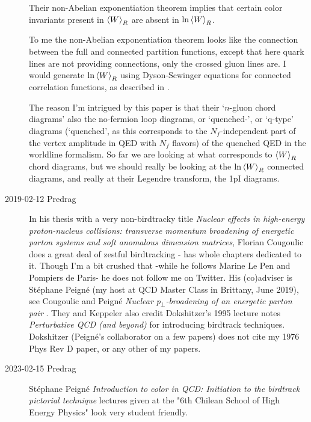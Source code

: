 \begin{description}
Their non-Abelian exponentiation theorem implies that certain color
invariants present in ${\left< {W} \right>}_R$ are absent in $\ln {\left< {W} \right>}_R$.

To me the non-Abelian exponentiation theorem looks like the connection
between the full and connected partition functions, except that here
quark lines are not providing connections, only the crossed gluon lines
are. I would generate $\ln {\left< {W} \right>}_R$ using Dyson-Scwinger equations for
connected correlation functions, as described in .

The reason I'm intrigued by this paper is that their `$n$-gluon chord
diagrams' also the no-fermion loop diagrams, or `quenched-', or `q-type'
diagrams (`quenched', as this corresponds to the $N_f$-independent part
of the vertex amplitude in QED with $N_f$ flavors) of the quenched QED in
the worldline formalism. So far we are looking at what corresponds to
${\left< {W} \right>}_R$ chord diagrams, but we should really be looking at the $\ln
{\left< {W} \right>}_R$ connected diagrams, and really at their Legendre transform,
the 1pI diagrams.

\item[2019-02-12 Predrag]
In his thesis with  a very non-birdtracky title {\em Nuclear
effects in high-energy proton-nucleus collisions: transverse momentum broadening
of energetic parton systems and soft anomalous dimension matrices},
 {Florian Cougoulic} does a great
deal of zestful birdtracking - has whole chapters dedicated to it.
Though I'm a bit crushed that -while he follows Marine Le Pen and
Pompiers de Paris- he does not follow me on
 {Twitter}. His (co)adviser is
{St{\'e}phane Peign{\'e}} (my host at QCD Master
Class in Brittany, June 2019), see
Cougoulic and Peign{\'{e}}
{\em Nuclear p$_\bot$-broadening of an energetic parton pair}
.
They and Keppeler also credit Dokshitzer's 1995 lecture notes
{\it Perturbative QCD (and beyond)} for introducing birdtrack techniques.
Dokshitzer (Peign{\'e}'s collaborator on a few papers) does not cite my 1976
Phys Rev D paper, or any other of my papers.

   \item[2023-02-15 Predrag]
St{\'e}phane Peign{\'e}
{\em Introduction to color in QCD: Initiation to the birdtrack pictorial technique}
lectures given at the "6th Chilean School of High Energy Physics" look
very student friendly.


\end{description}
